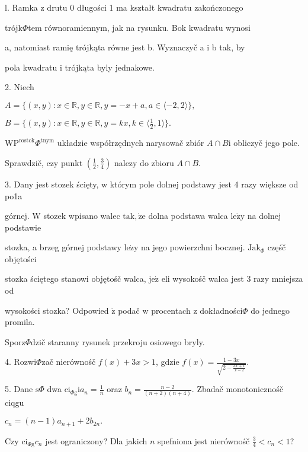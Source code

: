 \documentclass[a4paper,12pt]{article}
\begin{document}
l. Ramka z drutu 0 długości 1 ma kształt kwadratu zakończonego

trójk$\Phi$tem równoramiennym, jak na rysunku. Bok kwadratu wynosi

a, natomiast ramię trójkąta równe jest b. Wyznaczyč a i b tak, by

pola kwadratu i trójkąta byly jednakowe.

2. Niech

$A=\{(x,y):x\in \mathbb{R},y\in \mathbb{R},y=-x+a,a\in\langle-2,2\rangle\},$

$B=\displaystyle \{(x,y):x\in \mathbb{R},y\in \mathbb{R},y=kx,k\in\langle\frac{1}{2},1\rangle\}.$

$\mathrm{W}\mathrm{P}^{\mathrm{r}\mathrm{o}\mathrm{s}\mathrm{t}\mathrm{o}\mathrm{k}}\Phi^{\mathrm{t}\mathrm{n}\mathrm{y}\mathrm{m}}$ układzie współrzędnych narysowač zbiór $A\cap B\mathrm{i}$ obliczyč jego pole.

Sprawdzič, czy punkt $(\displaystyle \frac{1}{2},\frac{3}{4})$ nalezy do zbioru $A\cap B.$

3. Dany jest stozek ścięty, $\mathrm{w}$ którym pole dolnej podstawy jest 4 razy większe od po1a

górnej. $\mathrm{W}$ stozek wpisano walec $\mathrm{t}\mathrm{a}\mathrm{k}, \dot{\mathrm{z}}\mathrm{e}$ dolna podstawa walca $\mathrm{l}\mathrm{e}\dot{\mathrm{z}}\mathrm{y}$ na dolnej podstawie

stozka, a brzeg górnej podstawy $\mathrm{l}\mathrm{e}\dot{\mathrm{z}}\mathrm{y}$ na jego powierzchni bocznej. $\mathrm{J}\mathrm{a}\mathrm{k}_{\Phi}$ częśč objętości

stozka ściętego stanowi objętośč walca, $\mathrm{j}\mathrm{e}\dot{\mathrm{z}}$ eli wysokośč walca jest 3 razy mniejsza od

wysokości stozka? Odpowied $\acute{\mathrm{z}}$ podač $\mathrm{w}$ procentach $\mathrm{z}$ dokładności$\Phi$ do jednego promila.

Sporz$\Phi$dzič staranny rysunek przekroju osiowego bryly.

4. Rozwi$\Phi$zač nierównośč $f(x)+3x>1$, gdzie $f(x)=\displaystyle \frac{1-3x}{\sqrt{2-\frac{3x+1}{x-2}}}.$

5. Dane $\mathrm{s}\Phi$ dwa $\displaystyle \mathrm{c}\mathrm{i}_{\Phi \mathrm{g}}\mathrm{i}a_{n}=\frac{1}{n}$ oraz $b_{n}=\displaystyle \frac{n-2}{(n+2)(n+4)}$. Zbadač monotonicznośč ciqgu

$c_{n}=(n-1)a_{n+1}+2b_{2n}.$

Czy $\mathrm{c}\mathrm{i}_{\Phi \mathrm{g}}c_{n}$ jest ograniczony? Dla jakich $n$ spefniona jest nierównośč $\displaystyle \frac{3}{4}<c_{n}<1$?
\end{document}
